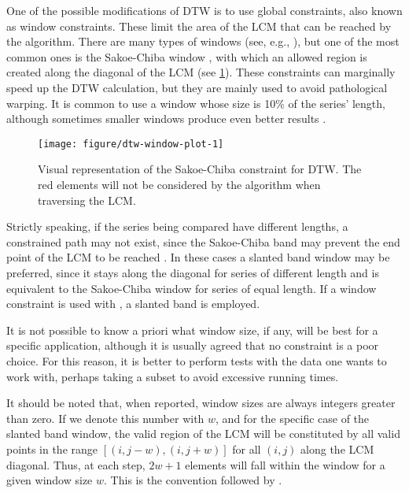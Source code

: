One of the possible modifications of DTW is to use global constraints,
also known as window constraints.
These limit the area of the LCM that can be reached by the algorithm.
There are many types of windows (see, e.g., \citet{giorgino2009}),
but one of the most common ones is the Sakoe-Chiba window \citep{sakoe1978},
with which an allowed region is created along the diagonal of the LCM (see \cref{fig:dtw-window-plot}).
These constraints can marginally speed up the DTW calculation,
but they are mainly used to avoid pathological warping.
It is common to use a window whose size is 10\% of the series' length,
although sometimes smaller windows produce even better results \citep{keogh2004}.

\begin{figure}[htbp]

{\centering \texttt{[image: figure/dtw-window-plot-1]}

}

\caption{Visual representation of the Sakoe-Chiba constraint for DTW. The red elements will not be considered by the algorithm when traversing the LCM.}\label{fig:dtw-window-plot}
\end{figure}

Strictly speaking,
if the series being compared have different lengths,
a constrained path may not exist,
since the Sakoe-Chiba band may prevent the end point of the LCM to be reached \citep{giorgino2009}.
In these cases a slanted band window may be preferred,
since it stays along the diagonal for series of different length and is equivalent to the Sakoe-Chiba window for series of equal length.
If a window constraint is used with \dtwclust{},
a slanted band is employed.

It is not possible to know a priori what window size, if any, will be best for a specific application,
although it is usually agreed that no constraint is a poor choice.
For this reason, it is better to perform tests with the data one wants to work with,
perhaps taking a subset to avoid excessive running times.

It should be noted that, when reported, window sizes are always integers greater than zero.
If we denote this number with $w$,
and for the specific case of the slanted band window,
the valid region of the LCM will be constituted by all valid points in the range
$\left[ (i,j - w), (i, j + w) \right]$
for all $(i,j)$ along the LCM diagonal.
Thus, at each step, $2w + 1$ elements will fall within the window for a given window size $w$.
This is the convention followed by \dtwclust{}.

